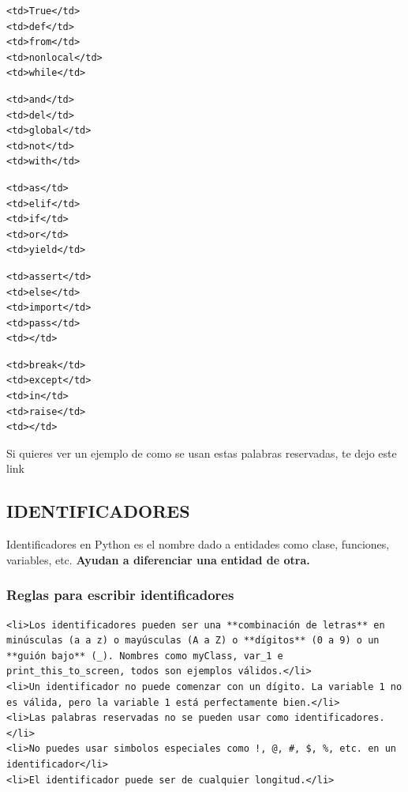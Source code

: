 \documentclass[11pt]{article}
\begin{document}
\begin{verbatim}
<td>True</td>
<td>def</td> 
<td>from</td>
<td>nonlocal</td>
<td>while</td>
\end{verbatim}

\begin{verbatim}
<td>and</td>
<td>del</td> 
<td>global</td>
<td>not</td>
<td>with</td>
\end{verbatim}

\begin{verbatim}
<td>as</td>
<td>elif</td> 
<td>if</td>
<td>or</td>
<td>yield</td>
\end{verbatim}

\begin{verbatim}
<td>assert</td>
<td>else</td> 
<td>import</td>
<td>pass</td>
<td></td>
\end{verbatim}

\begin{verbatim}
<td>break</td>
<td>except</td> 
<td>in</td>
<td>raise</td>
<td></td>
\end{verbatim}

Si quieres ver un ejemplo de como se usan estas palabras reservadas, te
dejo este link

    \subsection{IDENTIFICADORES}\label{identificadores}

Identificadores en Python es el nombre dado a entidades como clase,
funciones, variables, etc. \textbf{Ayudan a diferenciar una entidad de
otra.}

\subsubsection{Reglas para escribir
identificadores}\label{reglas-para-escribir-identificadores}

\begin{verbatim}
<li>Los identificadores pueden ser una **combinación de letras** en minúsculas (a a z) o mayúsculas (A a Z) o **dígitos** (0 a 9) o un **guión bajo** (_). Nombres como myClass, var_1 e print_this_to_screen, todos son ejemplos válidos.</li>
<li>Un identificador no puede comenzar con un dígito. La variable 1 no es válida, pero la variable 1 está perfectamente bien.</li>
<li>Las palabras reservadas no se pueden usar como identificadores.</li>
<li>No puedes usar simbolos especiales como !, @, #, $, %, etc. en un identificador</li>
<li>El identificador puede ser de cualquier longitud.</li>
\end{verbatim}
\end{document}
